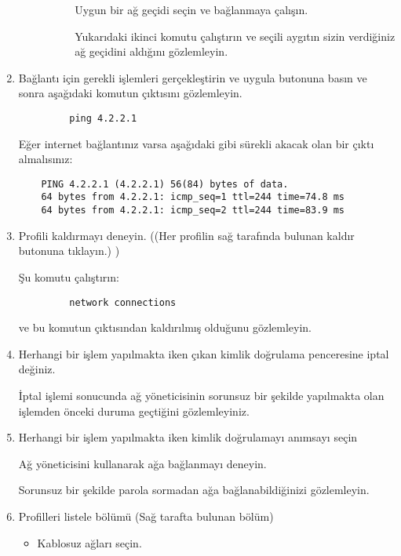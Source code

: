 \documentclass[a4paper,10pt]{article}
\begin{document}
\begin{enumerate}
\begin{enumerate}
\begin{enumerate}
\begin{itemize}
			Uygun bir ağ geçidi seçin ve bağlanmaya çalışın.
		     
		      Yukarıdaki ikinci komutu çalıştırın ve seçili aygıtın sizin verdiğiniz ağ geçidini aldığını gözlemleyin.
		\end{itemize}
	      \end{enumerate}
	  
	
      \end{enumerate}

	\item Bağlantı için gerekli işlemleri gerçekleştirin ve uygula butonuna basın ve sonra aşağıdaki komutun çıktısını gözlemleyin.
		\begin{verbatim}
		 ping 4.2.2.1
		\end{verbatim}

	Eğer internet bağlantınız varsa aşağıdaki gibi sürekli akacak olan bir çıktı almalısınız:
	\begin{verbatim}
	PING 4.2.2.1 (4.2.2.1) 56(84) bytes of data.
	64 bytes from 4.2.2.1: icmp_seq=1 ttl=244 time=74.8 ms
	64 bytes from 4.2.2.1: icmp_seq=2 ttl=244 time=83.9 ms
      	\end{verbatim}

      \item Profili kaldırmayı deneyin. ((Her profilin sağ tarafında bulunan kaldır butonuna tıklayın.) )
      
	    Şu komutu çalıştırın:
	    \begin{verbatim}
	     network connections
	    \end{verbatim}
	    ve bu komutun çıktısından kaldırılmış olduğunu gözlemleyin.

	\item Herhangi bir işlem yapılmakta iken çıkan kimlik doğrulama penceresine iptal değiniz.

	İptal işlemi sonucunda ağ yöneticisinin sorunsuz bir şekilde yapılmakta olan işlemden önceki duruma geçtiğini gözlemleyiniz.

	\item Herhangi bir işlem yapılmakta iken kimlik doğrulamayı anımsayı seçin 
	
	Ağ yöneticisini kullanarak ağa bağlanmayı deneyin.
	
	Sorunsuz bir şekilde parola sormadan ağa bağlanabildiğinizi gözlemleyin.
	\item Profilleri listele bölümü (Sağ tarafta bulunan bölüm)
	\begin{itemize}
	 \item Kablosuz ağları seçin.
	

\end{itemize}
\end{enumerate}
\end{document}
